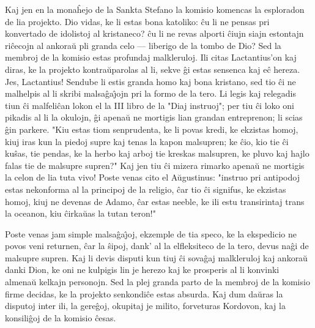    Kaj jen en la mona\^hejo de la Sankta Stefano la komisio komencas
la esploradon de lia projekto. Dio vidas, ke li estas bona katoliko:
\^cu li ne pensas pri konvertado de idolistoj al kristaneco? \^cu li
ne revas alporti \^ciujn siajn estontajn ri\^cecojn al ankora\u u
pli granda celo --- liberigo de la tombo de Dio? Sed la membroj de
la komisio estas profundaj malkleruloj. Ili citas Lactantius'on kaj
diras, ke la projekto kontra\u uparolas al li, sekve \^gi estas
sensenca kaj e\^c hereza. Jes, Lactantius! Sendube li estis granda
homo kaj bona kristano, sed tio \^ci ne malhelpis al li skribi
malsa\^ga\^{\j}ojn pri la formo de la tero. Li legis kaj relegadis
tiun \^ci malfeli\^can lokon el la III libro de la "Diaj
instruoj"; per tiu \^ci loko oni pikadis al li la okulojn, \^gi
apena\u u ne mortigis lian grandan entreprenon; li scias \^gin
parkere. "Kiu estas tiom senprudenta, ke li povas kredi, ke
ekzistas homoj, kiuj iras kun la piedoj supre kaj tenas la kapon
malsupren; ke \^cio, kio tie \^ci ku\^sas, tie pendas, ke la herbo
kaj arboj tie kreskas malsupren, ke pluvo kaj hajlo falas tie de
malsupre supren?" Kaj jen tiu \^ci mizera rimarko apena\u u ne
mortigis la celon de lia tuta vivo! Poste venas cito el A\u
ugustinus: "instruo pri antipodoj estas nekonforma al la principoj
de la religio, \^car tio \^ci signifus, ke ekzistas homoj, kiuj ne
devenas de Adamo, \^car estas neeble, ke ili estu transirintaj trans
la oceanon, kiu \^cirka\u uas la tutan teron!"

   Poste venas jam simple malsa\^ga\^{\j}oj, ekzemple de tia speco, ke
la ekspedicio ne povos veni returnen, \^car la \^sipoj, dank' al la
elfleksiteco de la tero, devus na\^gi de malsupre supren. Kaj li
devis disputi kun tiuj \^ci sova\^gaj malkleruloj kaj ankora\u u
danki Dion, ke oni ne kulpigis lin je herezo kaj ke prosperis al li
konvinki almena\u u kelkajn personojn. Sed la plej granda parto de
la membroj de la komisio firme decidas, ke la projekto senkondi\^ce
estas absurda. Kaj dum da\u uras la disputoj inter ili, la
gere\^goj, okupitaj je milito, forveturas Kordovon, kaj la
konsili\^goj de la komisio \^cesas.

